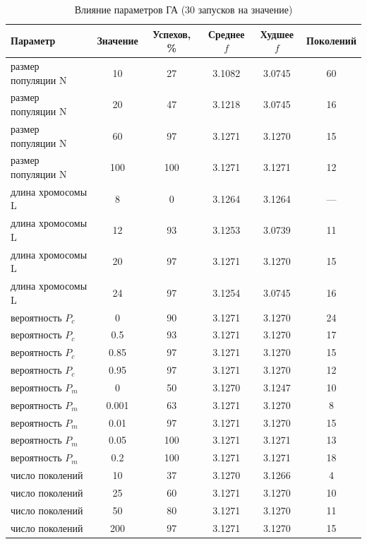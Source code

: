 \begin{table}[H]
\caption{Влияние параметров ГА (30 запусков на значение)}
\label{tab:params}
\centering
\small
\begin{tabular}{lccccc}
\toprule
Параметр & Значение & Успехов, \% & Среднее $f$ & Худшее $f$ & Поколений \\
\midrule
размер популяции N & 10 & 27 & 3.1082 & 3.0745 & 60 \\
размер популяции N & 20 & 47 & 3.1218 & 3.0745 & 16 \\
размер популяции N & 60 & 97 & 3.1271 & 3.1270 & 15 \\
размер популяции N & 100 & 100 & 3.1271 & 3.1271 & 12 \\
длина хромосомы L & 8 & 0 & 3.1264 & 3.1264 & --- \\
длина хромосомы L & 12 & 93 & 3.1253 & 3.0739 & 11 \\
длина хромосомы L & 20 & 97 & 3.1271 & 3.1270 & 15 \\
длина хромосомы L & 24 & 97 & 3.1254 & 3.0745 & 16 \\
вероятность $P_c$ & 0 & 90 & 3.1271 & 3.1270 & 24 \\
вероятность $P_c$ & 0.5 & 93 & 3.1271 & 3.1270 & 17 \\
вероятность $P_c$ & 0.85 & 97 & 3.1271 & 3.1270 & 15 \\
вероятность $P_c$ & 0.95 & 97 & 3.1271 & 3.1270 & 12 \\
вероятность $P_m$ & 0 & 50 & 3.1270 & 3.1247 & 10 \\
вероятность $P_m$ & 0.001 & 63 & 3.1271 & 3.1270 & 8 \\
вероятность $P_m$ & 0.01 & 97 & 3.1271 & 3.1270 & 15 \\
вероятность $P_m$ & 0.05 & 100 & 3.1271 & 3.1271 & 13 \\
вероятность $P_m$ & 0.2 & 100 & 3.1271 & 3.1271 & 18 \\
число поколений & 10 & 37 & 3.1270 & 3.1266 & 4 \\
число поколений & 25 & 60 & 3.1271 & 3.1270 & 10 \\
число поколений & 50 & 80 & 3.1271 & 3.1270 & 11 \\
число поколений & 200 & 97 & 3.1271 & 3.1270 & 15 \\
\bottomrule
\end{tabular}
\end{table}
